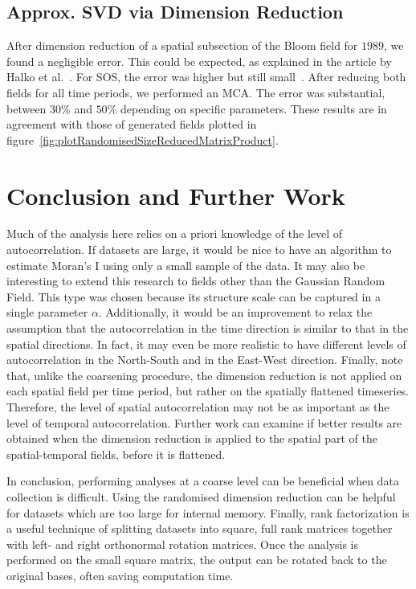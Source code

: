 \documentclass{acm_proc_article-sp}
\begin{document}
\subsection{Approx. SVD via Dimension Reduction}
\label{sec:Applications Approximate SVD via Dimension Reduction}

After dimension reduction of a spatial subsection of the Bloom field for $1989$, we found a negligible error. This could be expected, as explained in the article by Halko et al.~\cite{Halko2011}. For SOS, the error was higher but still small~\cite{Bogaardt2018}. After reducing both fields for all time periods, we performed an MCA. The error was substantial, between $30\%$ and $50\%$ depending on specific parameters. These results are in agreement with those of generated fields plotted in figure~\ref{fig:plotRandomisedSizeReducedMatrixProduct}.

\section{Conclusion and Further Work}
\label{sec:Conclusion and Further Work}

Much of the analysis here relies on a priori knowledge of the level of autocorrelation. If datasets are large, it would be nice to have an algorithm to estimate Moran's I using only a small sample of the data. It may also be interesting to extend this research to fields other than the Gaussian Random Field. This type was chosen because its structure scale can be captured in a single parameter $\alpha$. Additionally, it would be an improvement to relax the assumption that the autocorrelation in the time direction is similar to that in the spatial directions. In fact, it may even be more realistic to have different levels of autocorrelation in the North-South and in the East-West direction. Finally, note that, unlike the coarsening procedure, the dimension reduction is not applied on each spatial field per time period, but rather on the spatially flattened timeseries. Therefore, the level of spatial autocorrelation may not be as important as the level of temporal autocorrelation. Further work can examine if better results are obtained when the dimension reduction is applied to the spatial part of the spatial-temporal fields, before it is flattened.

In conclusion, performing analyses at a coarse level can be beneficial when data collection is difficult. Using the randomised dimension reduction can be helpful for datasets which are too large for internal memory. Finally, rank factorization is a useful technique of splitting datasets into square, full rank matrices together with left- and right orthonormal rotation matrices. Once the analysis is performed on the small square matrix, the output can be rotated back to the original bases, often saving computation time.

{
\footnotesize


}
\end{document}
